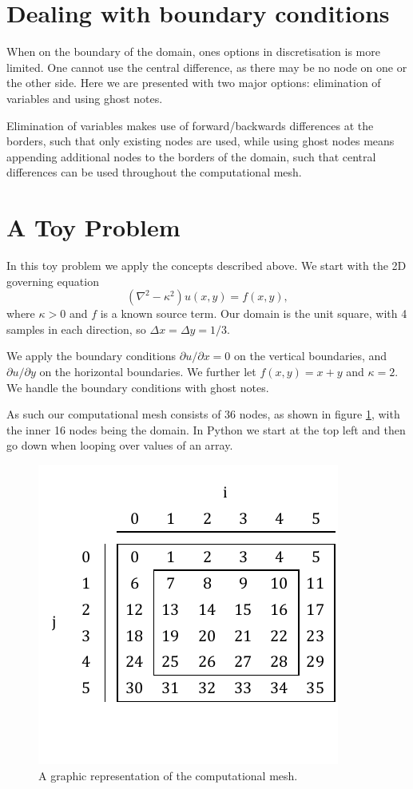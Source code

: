 \documentclass[sigconf]{acmart}
\begin{document}
\section{Dealing with boundary conditions}
When on the boundary of the domain, ones options in discretisation is more limited. One cannot use the central difference, as there may be no node on one or the other side. Here we are presented with two major options: elimination of variables and using ghost notes. 

Elimination of variables makes use of forward/backwards differences at the borders, such that only existing nodes are used, while using ghost nodes means appending additional nodes to the borders of the domain, such that central differences can be used throughout the computational mesh.

\section{A Toy Problem}
In this toy problem we apply the concepts described above. We start with the 2D governing equation
\begin{equation}\label{key}
	(\nabla^2 - \kappa^2)u(x,y) = f(x,y),
\end{equation}
where $ \kappa > 0 $ and $ f $ is a known source term. Our domain is the unit square, with 4 samples in each direction, so $\Delta x = \Delta y = 1/3  $.

We apply the boundary conditions $ \partial u / \partial x = 0 $ on the vertical boundaries, and $ \partial u / \partial y $ on the horizontal boundaries. We further let $ f(x,y) = x+y $ and $ \kappa = 2 $. We handle the boundary conditions with ghost notes.

As such our computational mesh consists of 36 nodes, as shown in figure \ref{fig:matrix_assembly}, with the inner 16 nodes being the domain. In Python we start at the top left and then go down when looping over values of an array.
\begin{figure}
	\centering
	\includegraphics{indices.pdf}
	\caption{A graphic representation of the computational mesh.}
	\label{fig:matrix_assembly}
\end{figure}
\end{document}
